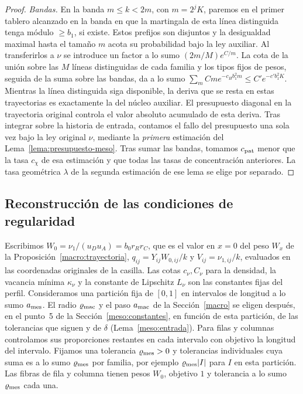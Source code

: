 \begin{proof}
\emph{Bandas.} En la banda $m\le k<2m$, con $m=2^jK$, paremos en el primer tablero alcanzado en la
banda en que la
martingala de esta línea distinguida tenga módulo $\ge b_1$, si existe. Estos prefijos son disjuntos
y la desigualdad maximal hasta el tamaño $m$ acota su probabilidad bajo la ley auxiliar. Al
transferirlos a $\nu$ se introduce un factor a lo sumo $(2m/M)e^{C/m}$. La cota de la unión sobre las
$M$ líneas distinguidas de cada familia y los tipos fijos de pesos, seguida de la suma sobre las
bandas, da a lo sumo $\sum_m C m e^{-c_H b_1^2 m}\le C'e^{-c' b_1^2K}$. Mientras la línea distinguida
siga disponible, la deriva que se resta en estas trayectorias es exactamente la del núcleo auxiliar.
El presupuesto diagonal en la trayectoria original controla el valor absoluto acumulado de esta
deriva. Tras integrar sobre la historia de entrada, contamos el fallo del presupuesto una sola vez
bajo la ley original $\nu$, mediante la \emph{primera} estimación del Lema~\ref{lema:presupuesto-meso}.
Tras sumar las bandas, tomamos $c_{\rm pat}$ menor que la tasa $c_\chi$ de esa estimación y que todas
las tasas de concentración anteriores. La tasa geométrica $\lambda$ de la segunda estimación de ese
lema se elige por separado.
\end{proof}

\subsection{Reconstrucción de las condiciones de regularidad}\label{meso:regularidad}
Escribimos $W_0=\nu_1/(u_Du_A)=b_0r_Rr_C$, que es el valor en $x=0$ del peso $W_x$ de la
Proposición~\ref{macro:trayectoria}, $q_{ij}=Y_{ij}W_{0,ij}/k$ y
$V_{ij}=\nu_{1,ij}/k$, evaluados en las coordenadas originales de la casilla. Las cotas $c_\nu,C_\nu$
para la densidad, la vacancia mínima $\kappa_\nu$ y la constante de Lipschitz $L_\nu$ son las
constantes fijas del perfil. Consideramos una partición fija de $[0,1]$ en intervalos de longitud a
lo sumo $a_{\rm mes}$. El radio $\varrho_{\rm mac}$ y el paso $a_{\rm mac}$ de la
Sección~\ref{macro} se eligen después, en el punto~5 de la Sección~\ref{meso:constantes}, en función
de esta partición, de las tolerancias que siguen y de $\delta$ (Lema~\ref{meso:entrada}). Para filas
y columnas controlamos sus proporciones restantes en cada intervalo con objetivo la longitud del
intervalo. Fijamos una tolerancia $\varrho_{\rm mes}>0$ y tolerancias individuales cuya suma es a lo
sumo $\varrho_{\rm mes}$ por familia, por ejemplo $\varrho_{\rm mes}|I|$ para $I$ en esta partición.
Las fibras de fila y columna tienen pesos $W_0$, objetivo $1$ y tolerancia a lo sumo
$\varrho_{\rm mes}$ cada una.

